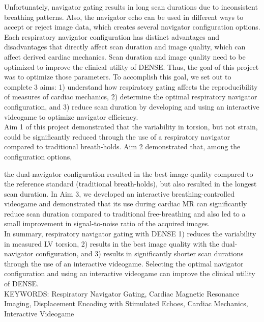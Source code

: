 Unfortunately, navigator gating results in long scan durations due to inconsistent breathing patterns. Also, the navigator echo can be used in different ways to accept or reject image data, which creates several navigator configuration options. Each respiratory navigator configuration has distinct advantages and disadvantages that directly affect scan duration and image quality, which can affect derived cardiac mechanics. Scan duration and image quality need to be optimized to improve the clinical utility of DENSE. Thus, the goal of this project was to optimize those parameters. To accomplish this goal, we set out to complete 3 aims: 1) understand how respiratory gating affects the reproducibility of measures of cardiac mechanics, 2) determine the optimal respiratory navigator configuration, and 3) reduce scan duration by developing and using an interactive videogame to optimize navigator efficiency.\\

Aim 1 of this project demonstrated that the variability in torsion, but not strain, could be significantly reduced through the use of a respiratory navigator compared to traditional breath-holds. Aim 2 demonstrated that, among the configuration options,

\restoregeometry
\thispagestyle{empty} %

\noindent the dual-navigator configuration resulted in the best image quality compared to the reference standard (traditional breath-holds), but also resulted in the longest scan duration. In Aim 3, we developed an interactive breathing-controlled videogame and demonstrated that its use during cardiac MR can significantly reduce scan duration compared to traditional free-breathing and also led to a small improvement in signal-to-noise ratio of the acquired images. \\

In summary, respiratory navigator gating with DENSE 1) reduces the variability in measured LV torsion, 2) results in the best image quality with the dual-navigator configuration, and 3) results in significantly shorter scan durations through the use of an interactive videogame. Selecting the optimal navigator configuration and using an interactive videogame can improve the clinical utility of DENSE.\\

\noindent KEYWORDS: Respiratory Navigator Gating, Cardiac Magnetic Resonance Imaging, Displacement Encoding with Stimulated Echoes, Cardiac Mechanics, Interactive Videogame

\vspace{4.5575in}        %
					



